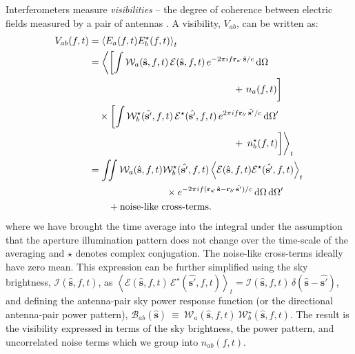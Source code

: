 \documentclass[a4paper,fleqn,usenatbib]{mnras}
\newcommand{\dif}{\mathrm{d}}
\begin{document}
Interferometers measure {\it visibilities} -- the degree of coherence between electric fields measured by a pair of antennas \citep{van34,zer38,tho01}. A visibility, $V_{ab}$, can be written as:
\begin{align}
  V_{ab}(f,t) &= \left\langle E_a(f,t)E_b^\star(f,t) \right\rangle_t \label{eqn:cc-vis}\hfill\\
              &= \left\langle \left[ \int \mathcal{W}_a(\hat{\mathbf{s}},f,t)\,\mathcal{E}(\hat{\mathbf{s}},f,t)\,e^{-2\pi i f\mathbf{r}_a\!\cdot\,\hat{\mathbf{s}}/c}\,\dif\Omega\right.\right. \nonumber\\
              &\qquad\qquad\qquad\qquad\qquad\qquad\qquad\quad + \left. n_a(f,t) \vphantom{\int}\right] \nonumber\\
              &\quad \times \left[ \int \mathcal{W}^\star_b(\hat{\mathbf{s'}},f,t)\,\mathcal{E}^\star (\hat{\mathbf{s'}},f,t)\,e^{2\pi i f\mathbf{r}_b\!\cdot\,\hat{\mathbf{s'}}/c}\,\dif\Omega^\prime \right. \nonumber\\
              &\qquad\qquad\qquad\qquad\qquad\qquad\qquad\quad + \left.\left. n^\star_b(f,t) \vphantom{\int}\right] \right\rangle_t \nonumber\\
              &= \iint \mathcal{W}_a(\hat{\mathbf{s}},f,t) \mathcal{W}^\star_b(\hat{\mathbf{s'}},f,t) \left\langle \mathcal{E}(\hat{\mathbf{s}},f,t) \mathcal{E}^\star(\hat{\mathbf{s'}},f,t) \right\rangle_t \nonumber\\
              &\qquad\qquad\qquad\qquad \times e^{-2\pi i f(\mathbf{r}_a\!\cdot\,\hat{\mathbf{s}}-\mathbf{r}_b\!\cdot\,\hat{\mathbf{s'}})/c}\,\dif\Omega\,\dif\Omega^\prime \nonumber\\
              &\qquad +\textrm{noise-like cross-terms.}
\end{align}
where we have brought the time average into the integral under the assumption that the aperture illumination pattern does not change over the time-scale of the averaging and $\star$ denotes complex conjugation. The noise-like cross-terms ideally have zero mean. This expression can be further simplified using the sky brightness, $\mathcal{I}(\hat{\mathbf{s}},f,t)$, as $\left\langle \mathcal{E}(\hat{\mathbf{s}},f,t)\,\mathcal{E}^\star(\hat{\mathbf{s'}},f,t) \right\rangle_t = \mathcal{I}(\hat{\mathbf{s}},f,t)\,\delta(\hat{\mathbf{s}}-\hat{\mathbf{s'}})$, and defining the antenna-pair sky power response function (or the directional antenna-pair power pattern), $\mathcal{B}_{ab}(\hat{\mathbf{s}})~\equiv~\mathcal{W}_a(\hat{\mathbf{s}},f,t)~\mathcal{W}^\star_b(\hat{\mathbf{s}},f,t)$. The result is the visibility expressed in terms of the sky brightness, the power pattern, and uncorrelated noise terms which we group into $n_{ab}(f,t)$.
\end{document}
